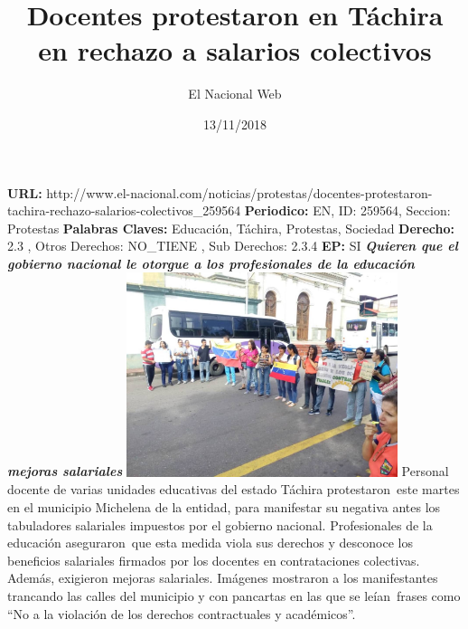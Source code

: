 \documentclass{article}%
\title{\textbf{Docentes protestaron en Táchira en rechazo a salarios colectivos}}%
\author{El Nacional Web}%
\date{13/11/2018}%
\begin{document}
%
\normalsize%
\maketitle%
\textbf{URL: }%
http://www.el{-}nacional.com/noticias/protestas/docentes{-}protestaron{-}tachira{-}rechazo{-}salarios{-}colectivos\_259564\newline%
%
\textbf{Periodico: }%
EN, %
ID: %
259564, %
Seccion: %
Protestas\newline%
%
\textbf{Palabras Claves: }%
Educación, Táchira, Protestas, Sociedad\newline%
%
\textbf{Derecho: }%
2.3%
, Otros Derechos: %
NO\_TIENE%
, Sub Derechos: %
2.3.4%
\newline%
%
\textbf{EP: }%
SI\newline%
\newline%
%
\textbf{\textit{Quieren que el gobierno nacional le otorgue a los profesionales de la educación mejoras salariales}}%
\newline%
\newline%
%
\includegraphics[width=300px]{208.jpg}%
\newline%
%
Personal docente de varias unidades educativas del estado Táchira protestaron~este martes en el municipio Michelena de la entidad, para manifestar su negativa antes los tabuladores salariales impuestos por el gobierno nacional.%
\newline%
%
Profesionales de la educación aseguraron~que esta medida viola sus derechos y desconoce los beneficios salariales firmados por los docentes en contrataciones colectivas. Además, exigieron mejoras salariales.%
\newline%
%
Imágenes mostraron a los manifestantes trancando las calles del municipio y con pancartas en las que se leían~frases como “No a la violación de los derechos contractuales y académicos”.%
\newline%
%
\end{document}
